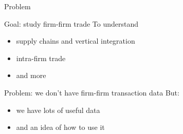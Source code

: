 \documentclass[12pt]{beamer}
\begin{document}

\begin{frame}{Problem}

\begin{block}{Goal: study firm-firm trade}
To understand
\begin{itemize}
\item supply chains and vertical integration
\item intra-firm trade
\item and more
\end{itemize}
\end{block}

\begin{block}{Problem: we don't have firm-firm transaction data}
But: 
\begin{itemize}
\item we have lots of useful data
\item and an idea of how to use it
\end{itemize}
\end{block}


\end{frame}
\end{document}
